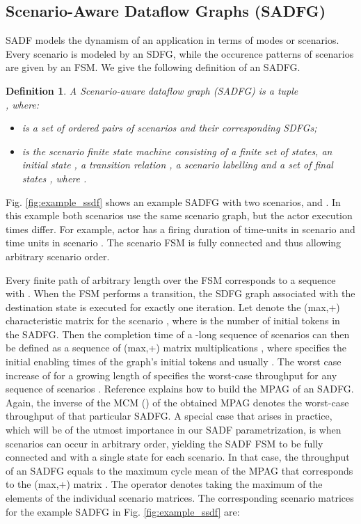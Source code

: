 \documentclass[]{eptcs}
\newtheorem{mydef}{Definition}
\begin{document}
\subsection{Scenario-Aware Dataflow Graphs (SADFG)}
SADF models the dynamism of an application in terms of modes or scenarios. Every scenario is modeled by an SDFG, while the occurence patterns of scenarios are given by an FSM. We give the following definition of an SADFG.
\begin{mydef}
A Scenario-aware dataflow graph (SADFG) is a tuple \\ , where:
\begin{itemize}
\item  is a set of ordered pairs of scenarios and their corresponding SDFGs;
\item  is the scenario finite state machine consisting of a finite set  of states, an initial state , a transition relation , a scenario labelling  and a set of final states , where .
\end{itemize}
\end{mydef}
Fig. \ref{fig:example_ssdf} shows an example SADFG with two scenarios,  and . In this example both scenarios use the same scenario graph, but the actor execution times differ. For example, actor  has a firing duration of  time-units in scenario  and  time units in scenario . The scenario FSM is fully connected and thus allowing arbitrary scenario order.

Every finite path of arbitrary length  over the FSM corresponds to a sequence  with . When the FSM performs a transition, the SDFG graph associated with the destination state is executed for exactly one iteration. Let  denote the  (max,+) characteristic matrix for the scenario , where  is the number of initial tokens in the SADFG. Then the completion time of a -long sequence of scenarios can then be defined as a sequence of (max,+) matrix multiplications , where  specifies the initial enabling times of the graph's initial tokens and usually . The worst case increase of  for a growing length of  specifies the worst-case throughput for any sequence of scenarios \cite{2gaub} \cite{2geil:all}.
Reference \cite{2geil:all} explains how to build the MPAG of an SADFG. Again, the inverse of the MCM () of the obtained MPAG denotes the worst-case throughput of that particular SADFG. A special case that arises in practice, which will be of the utmost importance in our SADF parametrization, is when scenarios can occur in arbitrary order, yielding the SADF FSM to be fully connected and with a single state for each scenario. In that case, the throughput of an SADFG equals to the maximum cycle mean of the MPAG that corresponds to the (max,+) matrix  \cite{2geil:all}. The operator  denotes taking the maximum of the elements of the individual scenario matrices. The corresponding scenario matrices for the example SADFG in Fig. \ref{fig:example_ssdf} are:
\end{document}
